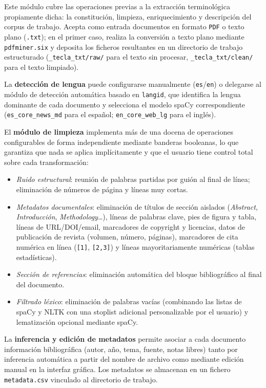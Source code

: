 Este módulo cubre las operaciones previas a la extracción terminológica propiamente dicha: la constitución, limpieza, enriquecimiento y descripción del corpus de trabajo. Acepta como entrada documentos en formato \texttt{PDF} o texto plano (\texttt{.txt}); en el primer caso, realiza la conversión a texto plano mediante \texttt{pdfminer.six} y deposita los ficheros resultantes en un directorio de trabajo estructurado (\texttt{\_tecla\_txt/raw/} para el texto sin procesar, \texttt{\_tecla\_txt/clean/} para el texto limpiado).

La \textbf{detección de lengua} puede configurarse manualmente (\texttt{es}/\texttt{en}) o delegarse al módulo de detección automática basado en \texttt{langid}, que identifica la lengua dominante de cada documento y selecciona el modelo spaCy correspondiente (\texttt{es\_core\_news\_md} para el español; \texttt{en\_core\_web\_lg} para el inglés).

El \textbf{módulo de limpieza} implementa más de una docena de operaciones configurables de forma independiente mediante banderas booleanas, lo que garantiza que nada se aplica implícitamente y que el usuario tiene control total sobre cada transformación:

\begin{itemize}
    \item \textit{Ruido estructural}: reunión de palabras partidas por guión al final de línea; eliminación de números de página y líneas muy cortas.
    \item \textit{Metadatos documentales}: eliminación de títulos de sección aislados (\textit{Abstract}, \textit{Introducción}, \textit{Methodology}…), líneas de palabras clave, pies de figura y tabla, líneas de URL/DOI/email, marcadores de copyright y licencias, datos de publicación de revista (volumen, número, páginas), marcadores de cita numérica en línea (\texttt{[1]}, \texttt{[2,3]}) y líneas mayoritariamente numéricas (tablas estadísticas).
    \item \textit{Sección de referencias}: eliminación automática del bloque bibliográfico al final del documento.
    \item \textit{Filtrado léxico}: eliminación de palabras vacías (combinando las listas de spaCy y NLTK con una stoplist adicional personalizable por el usuario) y lematización opcional mediante spaCy.
\end{itemize}

La \textbf{inferencia y edición de metadatos} permite asociar a cada documento información bibliográfica (autor, año, tema, fuente, notas libres) tanto por inferencia automática a partir del nombre de archivo como mediante edición manual en la interfaz gráfica. Los metadatos se almacenan en un fichero \texttt{metadata.csv} vinculado al directorio de trabajo.

